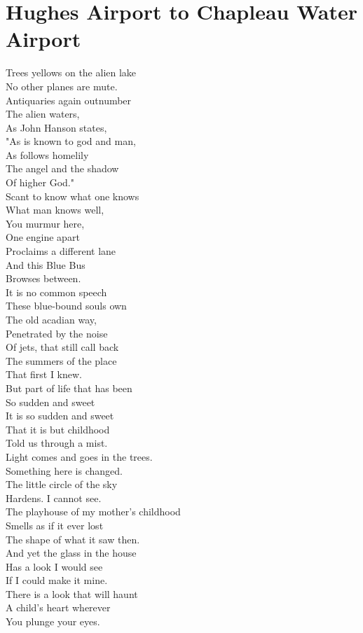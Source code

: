 \documentclass[smalldemyvopaper,11pt,twoside,onecolumn,openright,extrafontsizes]{memoir}
\begin{document}
\chapter{Hughes Airport to Chapleau Water Airport}
Trees yellows on the alien lake
\\No other planes are mute.
\\Antiquaries again outnumber
\\The alien waters,
\\As John Hanson states,
\\"As is known to god and man,
\\As follows homelily
\\The angel and the shadow
\\Of higher God."
\\Scant to know what one knows
\\What man knows well,
\\You murmur here,
\\One engine apart
\\Proclaims a different lane
\\And this Blue Bus
\\Browses between.
\\It is no common speech
\\These blue-bound souls own
\\The old acadian way,
\\Penetrated by the noise
\\Of jets, that still call back
\\The summers of the place
\\That first I knew.
\\But part of life that has been
\\So sudden and sweet
\\It is so sudden and sweet
\\That it is but childhood
\\Told us through a mist.
\\Light comes and goes in the trees.
\\Something here is changed.
\\The little circle of the sky
\\Hardens. I cannot see.
\\The playhouse of my mother's childhood
\\Smells as if it ever lost
\\The shape of what it saw then.
\\And yet the glass in the house
\\Has a look I would see
\\If I could make it mine.
\\There is a look that will haunt
\\A child's heart wherever
\\You plunge your eyes.
\end{document}
